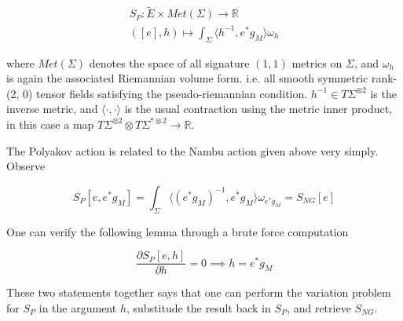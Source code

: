 \documentclass{article}
\begin{document}
                \begin{align}
                    S_P: \tilde E \times Met(\Sigma) \to \mathbb R\\
                    ([e], h) \mapsto \int_\Sigma \langle h^{-1}, e^*g_M \rangle\omega_h  
                \end{align}

                where $Met(\Sigma)$ denotes the space of all signature $(1, 1)$ metrics on $\Sigma$, and $\omega_h$ is again the associated Riemannian volume form. i.e. all smooth symmetric rank-(2, 0) tensor fields satisfying the pseudo-riemannian condition. $h^{-1} \in T\Sigma^{\otimes 2}$ is the inverse metric, and $\langle \cdot, \cdot \rangle$ is the usual contraction using the metric inner product, in this case a map $T\Sigma^{\otimes 2} \otimes T\Sigma^{*\otimes 2} \to \mathbb R$.

                The Polyakov action is related to the Nambu action given above very simply. Observe

                \begin{equation}
                    S_P[e, e^*g_M] = \int_\Sigma \langle (e^*g_M)^{-1}, e^*g_M \rangle\omega_{e^*g_M}   =  S_{NG}[e]
                \end{equation}

                One can verify the following lemma through a brute force computation

                \begin{equation}
                    \frac{\partial S_P[e, h]}{\partial h} = 0 \implies h = e^*g_M
                \end{equation}

                These two statements together says that one can perform the variation problem for $S_P$ in the argument $h$, substitude the result back in $S_P$, and retrieve $S_{NG}$.
\end{document}
